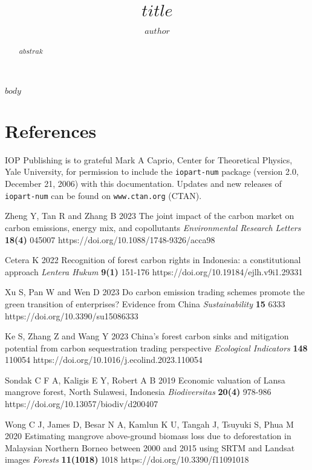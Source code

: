 \documentclass[a4paper]{jpconf}
\begin{document}
\title{$title$}

\author{$author$}

\address{$alamat$}


\begin{abstract}
$abstrak$
\end{abstract}

$body$

\section*{References}
\begin{thebibliography}{9}

 IOP Publishing is to grateful Mark A Caprio, Center for Theoretical Physics, Yale University, for permission to include the {\tt iopart-num} \BibTeX package (version 2.0, December 21, 2006) with  this documentation. Updates and new releases of {\tt iopart-num} can be found on \verb"www.ctan.org" (CTAN). 

 Zheng Y, Tan R and Zhang B 2023 The joint impact of the carbon market on carbon emissions, energy mix, and copollutants \emph{Environmental Research Letters} \textbf{18(4)} 045007 https://doi.org/10.1088/1748-9326/acca98

 Cetera K 2022 Recognition of forest carbon rights in Indonesia: a constitutional approach \emph{Lentera Hukum} \textbf{9(1)} 151-176 https://doi.org/10.19184/ejlh.v9i1.29331

 Xu S, Pan W and Wen D 2023 Do carbon emission trading schemes promote the green transition of enterprises? Evidence from China \emph{Sustainability} \textbf{15} 6333 https://doi.org/10.3390/su15086333

 Ke S, Zhang Z and Wang Y 2023 China's forest carbon sinks and mitigation potential from carbon sequestration trading perspective \emph{Ecological Indicators} \textbf{148} 110054 https://doi.org/10.1016/j.ecolind.2023.110054

 Sondak C F A, Kaligis E Y, Robert A B 2019 Economic valuation of Lansa mangrove forest, North Sulawesi, Indonesia \emph{Biodiversitas} \textbf{20(4)} 978-986 https://doi.org/10.13057/biodiv/d200407

 Wong C J, James D, Besar N A, Kamlun K U, Tangah J, Tsuyuki S, Phua M 2020 Estimating mangrove above-ground biomass loss due to deforestation in Malaysian Northern Borneo between 2000 and 2015 using SRTM and Landsat
images \emph{Forests} \textbf{11(1018)} 1018 https://doi.org/10.3390/f11091018


\end{thebibliography}
\end{document}
